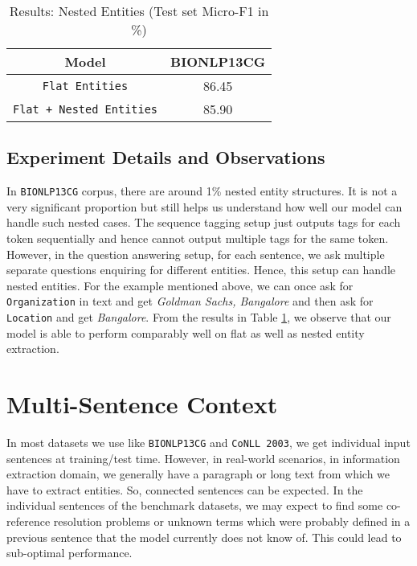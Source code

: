 \begin{table}[h!]
\centering
\begin{tabular}{|c|c|}\hline
	\textbf{Model} & \textbf{BIONLP13CG}\\\hline
	\texttt{Flat Entities} & 86.45\\\hline
	\texttt{Flat + Nested Entities} & 85.90\\\hline
	\end{tabular}
    \caption{Results: Nested Entities (Test set Micro-F1 in \%)}
    \label{tab:res_nesting}
\end{table}

\subsection{Experiment Details and Observations}

In \texttt{BIONLP13CG} corpus, there are around 1\% nested entity structures. It is not a very significant proportion but still helps us understand how well our model can handle such nested cases. The sequence tagging setup just outputs tags for each token sequentially and hence cannot output multiple tags for the same token. However, in the question answering setup, for each sentence, we ask multiple separate questions enquiring for different entities. Hence, this setup can handle nested entities. For the example mentioned above, we can once ask for \texttt{Organization} in text and get \textit{Goldman Sachs, Bangalore} and then ask for \texttt{Location} and get \textit{Bangalore}. From the results in Table \ref{tab:res_nesting}, we observe that our model is able to perform comparably well on flat as well as nested entity extraction.

\section{Multi-Sentence Context}
In most datasets we use like \texttt{BIONLP13CG} and \texttt{CoNLL 2003}, we get individual input sentences at training/test time. However, in real-world scenarios, in information extraction domain, we generally have a paragraph or long text from which we have to extract entities. So, connected sentences can be expected. In the individual sentences of the benchmark datasets, we may expect to find some co-reference resolution problems or unknown terms which were probably defined in a previous sentence that the model currently does not know of. This could lead to sub-optimal performance. 

